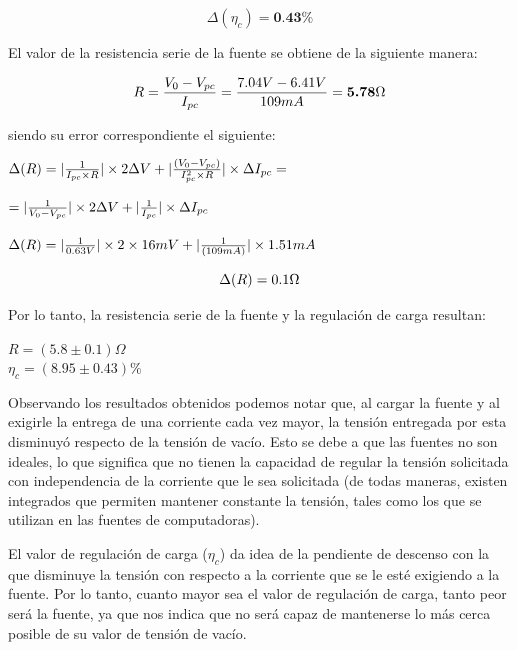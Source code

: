 \documentclass{article}
\begin{document}
\begin{equation}
	\Delta(\eta_c) = \textbf{0.43\%}
\end{equation}

\bigskip\bigskip


\noindent El valor de la resistencia serie de la fuente se obtiene de la siguiente manera:
\bigskip

\begin{equation}
	R = {V_{0} - V_{pc} \over I_{pc}} = {7.04V - 6.41V \over 109mA} = \textbf{5.78$\Omega$} \\
\end{equation}
\bigskip


\noindent siendo su error correspondiente el siguiente:
\bigskip


\begin{center}
	$\Delta(R) = |{1\over I_{pc} \times R}|\times 2\Delta V + |{(V_{0}-V_{pc})  \over  I_{pc}^2  \times R}| \times \Delta I_{pc} =$ \\
\end{center}

\begin{center}
$= |{1\over V_{0} - V_{pc}}|\times 2\Delta V + |{1 \over  I_{pc}}| \times \Delta I_{pc}$\\
\end{center}

\begin{center}
	$\Delta(R) = |{1\over 0.63V}|\times 2\times 16mV+ |{1  \over  (109mA)}| \times 1.51mA$ \\
\end{center}

\begin{equation}
	\Delta(R) = \textbf{$0.1 \Omega$}\\
\end{equation}
\bigskip\bigskip


\noindent Por lo tanto, la resistencia serie de la fuente y la regulación de carga resultan:
\medskip

\begin{center}
	$R = (5.8 \pm 0.1)\Omega $ \\ \medskip
	$\eta_c = (8.95 \pm 0.43)\% $ 
\end{center}
\bigskip\bigskip



	Observando los resultados obtenidos podemos notar que, al cargar la fuente y al exigirle la entrega de una corriente cada vez mayor, la tensión entregada por esta disminuyó respecto de la tensión de vacío. Esto se debe a que las fuentes no son ideales, lo que significa que no tienen la capacidad de regular la tensión solicitada con independencia de la corriente que le sea solicitada (de todas maneras, existen integrados que permiten mantener constante la tensión, tales como los que se utilizan en las fuentes de computadoras).
	\par
	El valor de regulación de carga ($\eta_c$) da idea de la pendiente de descenso con la que disminuye la tensión con respecto a la corriente que se le esté exigiendo a la fuente. Por lo tanto, cuanto mayor sea el valor de regulación de carga, tanto peor será la fuente, ya que nos indica que no será capaz de mantenerse lo más cerca posible de su valor de tensión de vacío.
\bigskip\bigskip
\end{document}
